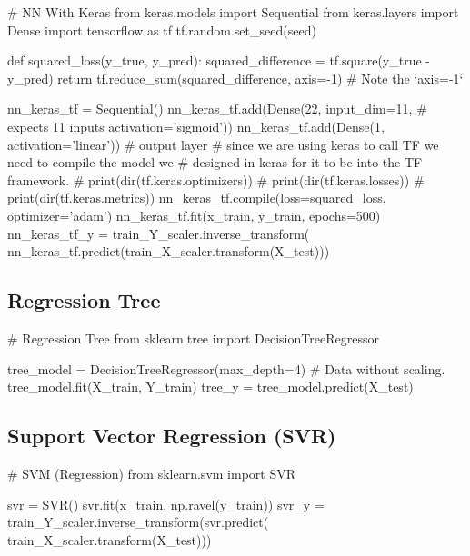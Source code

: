 \documentclass[11pt]{article}
\begin{document}
\begin{pyverbatim}[][]
# NN With Keras
from keras.models import Sequential
from keras.layers import Dense
import tensorflow as tf
tf.random.set_seed(seed)


def squared_loss(y_true, y_pred):
    squared_difference = tf.square(y_true - y_pred)
    return tf.reduce_sum(squared_difference, axis=-1)  # Note the `axis=-1`


nn_keras_tf = Sequential()
nn_keras_tf.add(Dense(22,
                      input_dim=11,  # expects 11 inputs
                      activation='sigmoid'))
nn_keras_tf.add(Dense(1, activation='linear'))  # output layer
# since we are using keras to call TF we need to compile the model we
# designed in keras for it to be into the TF framework.
# print(dir(tf.keras.optimizers))
# print(dir(tf.keras.losses))
# print(dir(tf.keras.metrics))
nn_keras_tf.compile(loss=squared_loss, optimizer='adam')
nn_keras_tf.fit(x_train, y_train, epochs=500)
nn_keras_tf_y = train_Y_scaler.inverse_transform(
                nn_keras_tf.predict(train_X_scaler.transform(X_test)))
\end{pyverbatim}

\subsection{Regression Tree}\label{subsec:regression-tree}

\begin{pyverbatim}[][]
# Regression Tree
from sklearn.tree import DecisionTreeRegressor

tree_model = DecisionTreeRegressor(max_depth=4)
# Data without scaling.
tree_model.fit(X_train, Y_train)
tree_y = tree_model.predict(X_test)
\end{pyverbatim}

\subsection{Support Vector Regression (SVR)}\label{subsec:support-vector-regression-(svr)}

\begin{pyverbatim}[][]
# SVM (Regression)
from sklearn.svm import SVR

svr = SVR()
svr.fit(x_train, np.ravel(y_train))
svr_y = train_Y_scaler.inverse_transform(svr.predict(
                                        train_X_scaler.transform(X_test)))
\end{pyverbatim}
\end{document}
